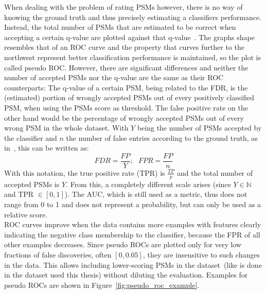 	When dealing with the problem of rating PSMs however, there is no way of knowing the ground truth and thus precisely estimating a classifiers performance. Instead, the total number of PSMs that are estimated to be correct when accepting a certain q-value are plotted against that q-value~\cite{Kll2007, Granholm2012}. The graphs shape resembles that of an ROC curve and the property that curves further to the northwest represent better classification performance is maintained, so the plot is called pseudo ROC. However, there are significant differences and neither the number of accepted PSMs nor the q-value are the same as their ROC counterparts: The q-value of a certain PSM, being related to the FDR, is the (estimated) portion of wrongly accepted PSMs out of every positively classified PSM, when using the PSMs score as threshold. The false positive rate on the other hand would be the percentage of wrongly accepted PSMs out of every wrong PSM in the whole dataset. With $Y$ being the number of PSMs accepted by the classifier and $n$ the number of false entries according to the ground truth, as in~\citet{Fawcett2006}, this can be written as:\\
	\begin{equation}
		FDR = \frac{FP}{Y};~~~ FPR = \frac{FP}{n}
	\end{equation}
	With this notation, the true positive rate (TPR) is $\frac{TP}{p}$ and the total number of accepted PSMs is $Y$. From this, a completely different scale arises (since $Y \in \mathbb{N}$ and TPR $\in [0,1]$). The AUC, which is still used as a metric, thus does not range from 0 to 1 and does not represent a probability, but can only be used as a relative score.\\
	ROC curves improve when the data contains more examples with features clearly indicating the negative class membership to the classifier, because the FPR of all other examples decreases. Since pseudo ROCs are plotted only for very low fractions of false discoveries, often $[0,0.05]$, they are insensitive to such changes in the data. This allows including lower-scoring PSMs in the dataset~(like is done in the dataset used this thesis) without diluting the evaluation. Examples for pseudo ROCs are shown in Figure~\ref{fig:pseudo_roc_example}.
	\renewcommand{\baselinestretch}{0.9}
